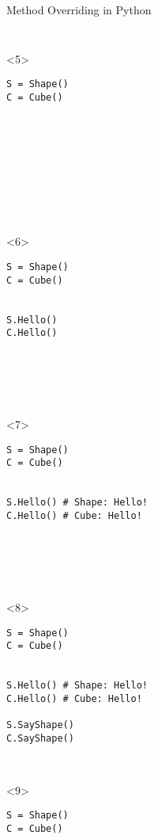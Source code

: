 \begin{frame}[fragile]{Method Overriding in Python}
\begin{columns}[onlytextwidth]
\begin{column}{0.47\textwidth}
\begin{onlyenv}
\begin{lstlisting}[style=python,basicstyle=\ttfamily\footnotesize]
 \end{lstlisting}
      \end{onlyenv}

      \begin{onlyenv}<5>
        \begin{lstlisting}[style=python,basicstyle=\ttfamily\footnotesize]
S = Shape()
C = Cube()










 \end{lstlisting}
      \end{onlyenv}

      \begin{onlyenv}<6>
        \begin{lstlisting}[style=python,basicstyle=\ttfamily\footnotesize]
S = Shape()
C = Cube()


S.Hello()
C.Hello()






 \end{lstlisting}
      \end{onlyenv}

      \begin{onlyenv}<7>
        \begin{lstlisting}[style=python,basicstyle=\ttfamily\footnotesize]
S = Shape()
C = Cube()


S.Hello() # Shape: Hello!
C.Hello() # Cube: Hello!






 \end{lstlisting}
      \end{onlyenv}

      \begin{onlyenv}<8>
        \begin{lstlisting}[style=python,basicstyle=\ttfamily\footnotesize]
S = Shape()
C = Cube()


S.Hello() # Shape: Hello!
C.Hello() # Cube: Hello!

S.SayShape()
C.SayShape()



 \end{lstlisting}
      \end{onlyenv}

      \begin{onlyenv}<9>
        \begin{lstlisting}[style=python,basicstyle=\ttfamily\footnotesize]
S = Shape()
C = Cube()



\end{lstlisting}
\end{onlyenv}
\end{column}
\end{columns}
\end{frame}

